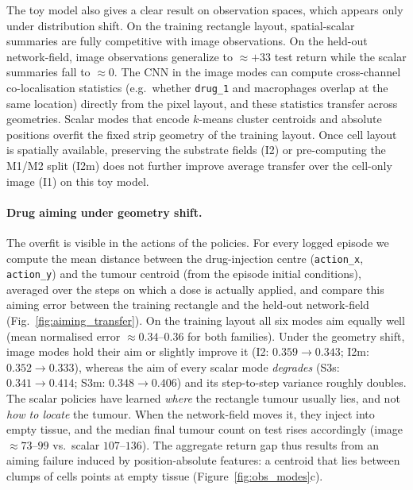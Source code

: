 \documentclass{article}
\begin{document}
The toy model also gives a clear result on observation spaces, which appears
only under distribution shift. On the training rectangle layout, spatial-scalar
summaries are fully competitive with image observations. On the held-out
network-field, image observations generalize to ${\approx}{+}33$ test return
while the scalar summaries fall to ${\approx}0$. The CNN in the image modes can
compute cross-channel co-localisation statistics (e.g.\ whether \texttt{drug\_1}
and macrophages overlap at the same location) directly from the pixel layout,
and these statistics transfer across geometries. Scalar modes that encode
$k$-means cluster centroids and absolute positions overfit the fixed strip
geometry of the training layout. Once cell layout is spatially
available, preserving the substrate fields (I2) or pre-computing the M1/M2 split
(I2m) does not further improve average transfer over the cell-only image (I1) on
this toy model.

\paragraph{Drug aiming under geometry shift.}
The overfit is visible in the actions of the policies. For every logged episode we compute the mean distance
between the drug-injection centre (\texttt{action\_x}, \texttt{action\_y}) and
the tumour centroid (from the episode initial conditions), averaged over the
steps on which a dose is actually applied, and compare this aiming error between
the training rectangle and the held-out network-field
(Fig.~\ref{fig:aiming_transfer}). On the training layout all six modes aim
equally well (mean normalised error ${\approx}0.34$--$0.36$ for both families).
Under the geometry shift, image modes hold their aim or slightly improve it
(I2: $0.359\!\to\!0.343$; I2m: $0.352\!\to\!0.333$), whereas the aim of every
scalar mode \emph{degrades} (S3s: $0.341\!\to\!0.414$; S3m: $0.348\!\to\!0.406$)
and its step-to-step variance roughly doubles. The scalar policies have learned
\emph{where} the rectangle tumour usually lies, and not \emph{how to locate} the
tumour. When the network-field moves it, they inject into empty tissue, and the
median final tumour count on test rises accordingly (image ${\approx}73$--$99$
vs.\ scalar $107$--$136$). The aggregate return gap thus results from an aiming
failure induced by position-absolute features: a centroid that lies between
clumps of cells points at empty tissue (Figure~\ref{fig:obs_modes}c).
\end{document}
